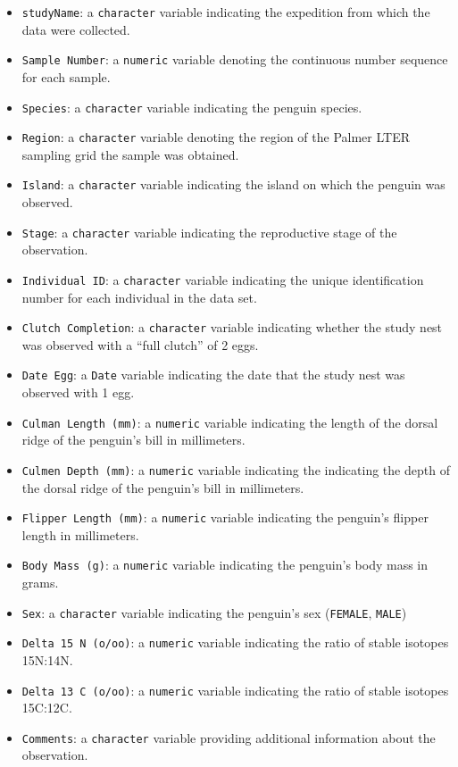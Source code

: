 \documentclass[
]{book}
\providecommand{\tightlist}{%
  \setlength{\itemsep}{0pt}\setlength{\parskip}{0pt}}
\theoremstyle{definition}
\theoremstyle{definition}
\theoremstyle{definition}
\theoremstyle{definition}
\theoremstyle{remark}
\begin{document}
\begin{itemize}
\tightlist
\item
  \texttt{studyName}: a \texttt{character} variable indicating the expedition from which the data were collected.
\item
  \texttt{Sample\ Number}: a \texttt{numeric} variable denoting the continuous number sequence for each sample.
\item
  \texttt{Species}: a \texttt{character} variable indicating the penguin species.
\item
  \texttt{Region}: a \texttt{character} variable denoting the region of the Palmer LTER sampling grid the sample was obtained.
\item
  \texttt{Island}: a \texttt{character} variable indicating the island on which the penguin was observed.
\item
  \texttt{Stage}: a \texttt{character} variable indicating the reproductive stage of the observation.
\item
  \texttt{Individual\ ID}: a \texttt{character} variable indicating the unique identification number for each individual in the data set.
\item
  \texttt{Clutch\ Completion}: a \texttt{character} variable indicating whether the study nest was observed with a ``full clutch'' of 2 eggs.
\item
  \texttt{Date\ Egg}: a \texttt{Date} variable indicating the date that the study nest was observed with 1 egg.
\item
  \texttt{Culman\ Length\ (mm)}: a \texttt{numeric} variable indicating the length of the dorsal ridge of the penguin's bill in millimeters.
\item
  \texttt{Culmen\ Depth\ (mm)}: a \texttt{numeric} variable indicating the indicating the depth of the dorsal ridge of the penguin's bill in millimeters.
\item
  \texttt{Flipper\ Length\ (mm)}: a \texttt{numeric} variable indicating the penguin's flipper length in millimeters.
\item
  \texttt{Body\ Mass\ (g)}: a \texttt{numeric} variable indicating the penguin's body mass in grams.
\item
  \texttt{Sex}: a \texttt{character} variable indicating the penguin's sex (\texttt{FEMALE}, \texttt{MALE})
\item
  \texttt{Delta\ 15\ N\ (o/oo)}: a \texttt{numeric} variable indicating the ratio of stable isotopes 15N:14N.
\item
  \texttt{Delta\ 13\ C\ (o/oo)}: a \texttt{numeric} variable indicating the ratio of stable isotopes 15C:12C.
\item
  \texttt{Comments}: a \texttt{character} variable providing additional information about the observation.
\end{itemize}
\end{document}
